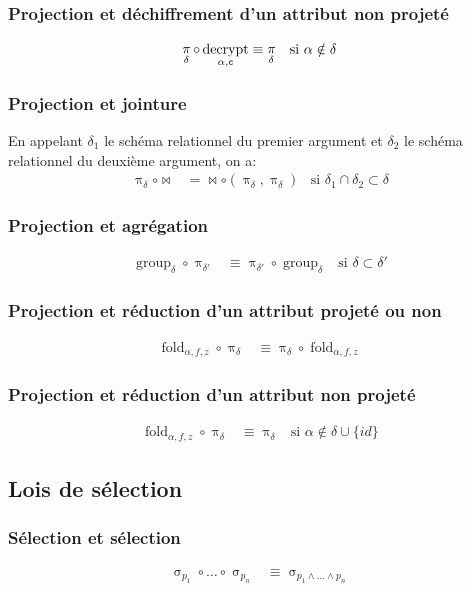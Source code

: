 \documentclass[french]{article}
\DeclareMathOperator{\proj}{\pi}
\DeclareMathOperator{\sel}{\sigma}
\DeclareMathOperator{\decrypt}{decrypt}
\DeclareMathOperator{\group}{group}
\newcommand\typeT[1]{\text{\ttfamily #1}}
\newcommand{\decryptArgs}[2]{\decrypt_{#1 , \typeT{#2}}}
\newcommand{\projDelta}{\proj_{\delta}}
\newcommand{\groupDelta}{\group_{\delta}}
\newcommand{\cip}{\cup \{id\}}
\newcommand{\fold}[3]{\operatorname{fold}_{#1, #2, #3}}
\newcommand{\foldAlphafz}{\fold{\alpha}{f}{z}}
\newcommand{\dilta}{{\delta \cip}}
\begin{document}
\subsubsection*{Projection et déchiffrement d'un attribut non projeté}
\begin{align}
\projDelta \circ \decryptArgs{\alpha}{c}
& \equiv \projDelta
&\text{si $\alpha \notin \delta$} 
\end{align}
\subsubsection*{Projection et jointure}
En appelant $\delta_1$ le schéma relationnel du premier
argument et $\delta_2$ le schéma relationnel du deuxième argument,
on a:
\begin{align}
\projDelta \circ \Join
& = \Join \circ (\projDelta, \projDelta)
& \text{si $\delta_1 \cap \delta_2 \subset \delta$}
\end{align}
\subsubsection*{Projection et agrégation}
\begin{align}
\groupDelta \circ \proj_{\delta'}
& \equiv \proj_{\delta'} \circ \groupDelta
& \text{si $\delta \subset \delta'$}
\end{align}
\subsubsection*{Projection et réduction d'un attribut projeté ou non}
\begin{align}
\foldAlphafz \circ \projDelta
& \equiv \projDelta \circ \foldAlphafz
\end{align}
\subsubsection*{Projection et réduction d'un attribut non projeté}
\begin{align}
\foldAlphafz \circ \projDelta
& \equiv \projDelta
& \text{si $\alpha \notin \dilta$}
\end{align}
\subsection*{Lois de sélection}
\subsubsection*{Sélection et sélection}
\begin{align}
\sel_{p_1} \circ \dots \circ \sel_{p_n}
&\equiv \sel_{p_1 \wedge \dots \wedge p_n} 
\end{align}
\end{document}
